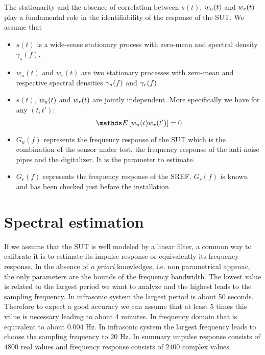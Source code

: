 The stationarity and the absence of correlation between $s(t)$, $w_{{u}}(t)$ and $w_{{r}}(t)$ play a fundamental  role in the identifiability of the response of the SUT. We assume that
\begin{itemize}
\item
$s(t)$ is a wide-sense stationary process with zero-mean and spectral density $\gamma_{s}(f)$,
\item
$w_{u}(t)$ and $w_{r}(t)$ are two  stationary processes with zero-mean and respective spectral densities $\gamma_{{u}}(f)$ and $\gamma_{{r}}(f)$. 
\item
$s(t)$,  $w_{{u}}(t)$ and $w_{{r}}(t)$ are jointly independent. More specifically we have for any $(t,t')$:
$$
 \esp{w_{\ut}(t)w_{r}(t')}=0
$$
\item
$G_{u}(f)$ represents the frequency response of the SUT which is the combination of the sensor under test, the frequency response of the anti-noise pipes and the digitalizer. It is the parameter to estimate.
\item
$G_{r}(f)$ represents the frequency response of the SREF. $G_{r}(f)$ is known and has been checked just before the installation.
\end{itemize}



\section{Spectral estimation}
If we assume that the SUT is well modeled by a linear filter, a common way to calibrate it is to estimate its impulse response or equivalently its frequency response. In the absence of {\it a priori} knowledges, i.e. non parametrical approac, the only parameters are the bounds of the frequency bandwidth. The lowest value is related to the largest period we want to analyze and the highest leads to the sampling frequency. In infrasonic system the largest period is about 50 seconds. Therefore to expect a good accuracy we can assume that at least 5 times this value is necessary leading to about 4 minutes. In frequency domain that is equivalent to about $0.004$ Hz. In infrasonic system the largest frequency leads to choose the sampling frequency to $20$ Hz. In summary impulse response consists of $4800$ real values and frequency response consists of $2400$ complex values. 


